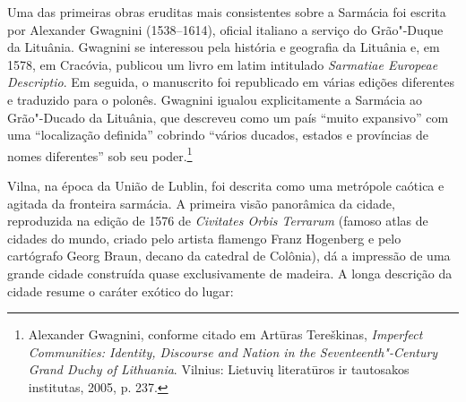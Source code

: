 %

Uma das primeiras obras eruditas mais consistentes sobre a Sarmácia foi
escrita por Alexander Gwagnini (1538--1614), oficial italiano a serviço
do Grão"-Duque da Lituânia. Gwagnini se interessou pela história e
geografia da Lituânia e, em 1578, em Cracóvia, publicou um livro em
latim intitulado \emph{Sarmatiae Europeae Descriptio}. Em seguida, o
manuscrito foi republicado em várias edições diferentes e traduzido para
o polonês. Gwagnini igualou explicitamente a Sarmácia ao Grão"-Ducado da
Lituânia, que descreveu como um país ``muito expansivo'' com uma
``localização definida'' cobrindo ``vários ducados, estados e províncias
de nomes diferentes'' sob seu poder.\footnote{Alexander Gwagnini,
  conforme citado em Artūras Tereškinas, \emph{Imperfect Communities:
  Identity, Discourse and Nation in the Seventeenth"-Century Grand Duchy
  of Lithuania}. Vilnius: Lietuvių literatūros ir tautosakos institutas,
  2005, p. 237.}

Vilna, na época da União de Lublin, foi descrita como uma metrópole
caótica e agitada da fronteira sarmácia. A primeira visão panorâmica da
cidade, reproduzida na edição de 1576 de \emph{Civitates Orbis Terrarum}
(famoso atlas de cidades do mundo, criado pelo artista flamengo Franz
Hogenberg e pelo cartógrafo Georg Braun, decano da catedral de Colônia),
dá a impressão de uma grande cidade construída quase exclusivamente de
madeira. A longa descrição da cidade resume o caráter exótico do lugar:

